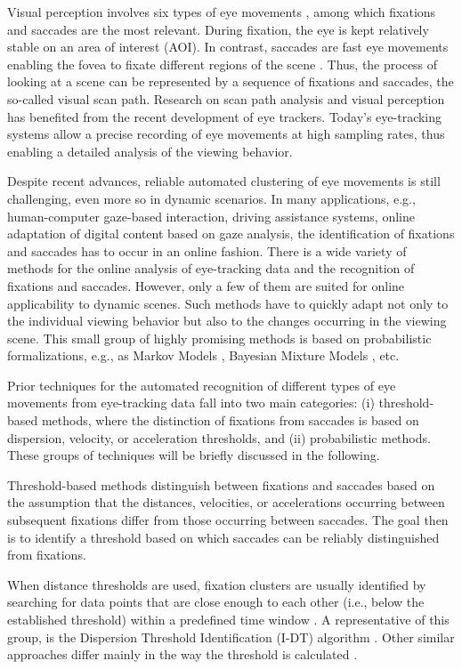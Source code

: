\documentclass[preprint,12pt]{elsarticle}
\begin{document}
Visual perception involves six types of eye movements \cite{leigh2015neurology}, among which fixations and saccades are the most relevant.
During fixation, the eye is kept relatively stable on an area of interest (AOI). In contrast, saccades are fast eye movements enabling the fovea to fixate different regions of the scene \cite{privitera:2005:scanpath_theory}.
Thus, the process of looking at a scene can be represented by a sequence of fixations and saccades, the so-called visual scan path.
Research on scan path analysis and visual perception has benefited from the recent development of eye trackers.
Today’s eye-tracking systems allow a precise recording of eye movements at high sampling rates, thus enabling a detailed analysis of the viewing behavior.

Despite recent advances, reliable automated clustering of eye movements is still challenging, even more so in dynamic scenarios.
In many applications, e.g., human-computer gaze-based interaction, driving assistance systems, online adaptation of digital content based on gaze analysis, the identification of fixations and saccades has to occur in an online fashion.
There is a wide variety of methods for the online analysis of eye-tracking data and the recognition of fixations and saccades.
However, only a few of them are suited for online applicability to dynamic scenes.
Such methods have to quickly adapt not only to the individual viewing behavior but also to the changes occurring in the viewing scene.
This small group of highly promising methods is based on probabilistic formalizations, e.g.,
as Markov Models \cite{Salvucci:2000:IFS:355017.355028, Komogortsev2013},
Bayesian Mixture Models \cite{Tafaj:2012:BOC:2168556.2168617}, etc.

Prior techniques for the automated recognition of different types of eye movements from eye-tracking data fall into two main categories:
(i) threshold-based methods, where the distinction of fixations from saccades is based on dispersion, velocity, or acceleration thresholds, and
(ii) probabilistic methods. These groups of techniques will be briefly discussed in the following.

Threshold-based methods distinguish between fixations and saccades based on the assumption that the distances, velocities, or accelerations occurring between subsequent fixations differ from those occurring between saccades.
The goal then is to identify a threshold based on which saccades can be reliably distinguished from fixations.

When distance thresholds are used, fixation clusters are usually identified by searching for data points that are close enough to each other (i.e., below the established threshold) within a predefined time window \cite{holmqvist-eye-tracking-a-comprehensive-guide-to-methods-and-measures}.
A representative of this group, is the Dispersion Threshold Identification (I-DT) algorithm \cite{Salvucci:2000:IFS:355017.355028}.
Other similar approaches differ mainly in the way the threshold is calculated \cite{Blignaut2009, Shic:2008:IFM:1344471.1344500}.
\end{document}
